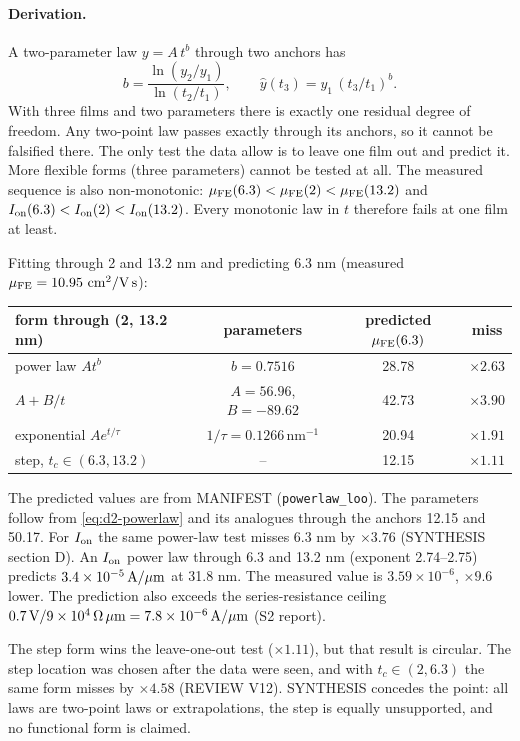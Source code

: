 \paragraph{Derivation.}
A two-parameter law $y=A\,t^{b}$ through two anchors has
\begin{equation}
  b=\frac{\ln(y_2/y_1)}{\ln(t_2/t_1)},\qquad \hat y(t_3)=y_1\,(t_3/t_1)^{b}.
  \label{eq:d2-powerlaw}
\end{equation}
With three films and two parameters there is exactly one residual degree of freedom. Any two-point law passes exactly through its anchors, so it cannot be falsified there. The only test the data allow is to leave one film out and predict it. More flexible forms (three parameters) cannot be tested at all. The measured sequence is also non-monotonic: $\mu_{\mathrm{FE}}(6.3)<\mu_{\mathrm{FE}}(2)<\mu_{\mathrm{FE}}(13.2)$ and $I_{\mathrm{on}}(6.3)<I_{\mathrm{on}}(2)<I_{\mathrm{on}}(13.2)$. Every monotonic law in $t$ therefore fails at one film at least.

Fitting through 2 and 13.2 nm and predicting 6.3 nm (measured $\mu_{\mathrm{FE}}=10.95\,\,\mathrm{cm}^{2}/\mathrm{V\,s}$):
\begin{center}
\small
\begin{tabular}{@{}lccc@{}}
\toprule
form through (2, 13.2 nm) & parameters & predicted $\mu_{\mathrm{FE}}(6.3)$ & miss \\
\midrule
power law $A t^{b}$ & $b=0.7516$ & 28.78 & $\times2.63$ \\
$A+B/t$ & $A=56.96$, $B=-89.62$ & 42.73 & $\times3.90$ \\
exponential $A e^{t/\tau}$ & $1/\tau=0.1266$\,nm$^{-1}$ & 20.94 & $\times1.91$ \\
step, $t_c\in(6.3,13.2)$ & -- & 12.15 & $\times1.11$ \\
\bottomrule
\end{tabular}
\end{center}
The predicted values are from MANIFEST (\texttt{powerlaw\_loo}). The parameters follow from \cref{eq:d2-powerlaw} and its analogues through the anchors 12.15 and 50.17. For $I_{\mathrm{on}}$ the same power-law test misses 6.3 nm by $\times3.76$ (SYNTHESIS section D). An $I_{\mathrm{on}}$ power law through 6.3 and 13.2 nm (exponent 2.74--2.75) predicts $3.4\times10^{-5}\,\mathrm{A}/\mu\mathrm{m}$ at 31.8 nm. The measured value is $3.59\times10^{-6}$, $\times9.6$ lower. The prediction also exceeds the series-resistance ceiling $0.7\,\mathrm{V}/9\times10^{4}\,\Omega\,\mu\mathrm{m}=7.8\times10^{-6}\,\mathrm{A}/\mu\mathrm{m}$ (S2 report).

The step form wins the leave-one-out test ($\times1.11$), but that result is circular. The step location was chosen after the data were seen, and with $t_c\in(2,6.3)$ the same form misses by $\times4.58$ (REVIEW V12). SYNTHESIS concedes the point: all laws are two-point laws or extrapolations, the step is equally unsupported, and no functional form is claimed.

